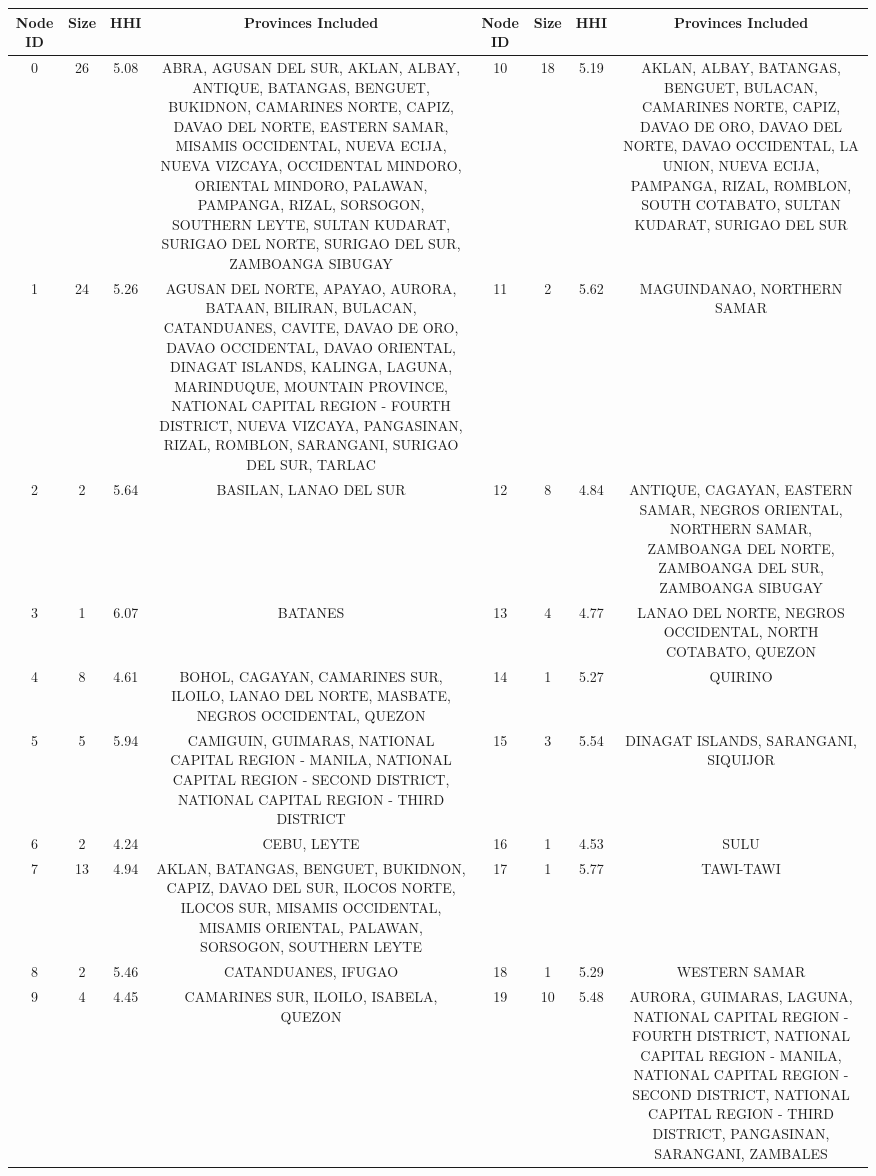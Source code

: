 \begin{tabular}{cccc|cccc}
\toprule
Node ID & Size & HHI & Provinces Included & Node ID & Size & HHI & Provinces Included \\
\midrule
0 & 26 & 5.08 & ABRA, AGUSAN DEL SUR, AKLAN, ALBAY, ANTIQUE, BATANGAS, BENGUET, BUKIDNON, CAMARINES NORTE, CAPIZ, DAVAO DEL NORTE, EASTERN SAMAR, MISAMIS OCCIDENTAL, NUEVA ECIJA, NUEVA VIZCAYA, OCCIDENTAL MINDORO, ORIENTAL MINDORO, PALAWAN, PAMPANGA, RIZAL, SORSOGON, SOUTHERN LEYTE, SULTAN KUDARAT, SURIGAO DEL NORTE, SURIGAO DEL SUR, ZAMBOANGA SIBUGAY & 10 & 18 & 5.19 & AKLAN, ALBAY, BATANGAS, BENGUET, BULACAN, CAMARINES NORTE, CAPIZ, DAVAO DE ORO, DAVAO DEL NORTE, DAVAO OCCIDENTAL, LA UNION, NUEVA ECIJA, PAMPANGA, RIZAL, ROMBLON, SOUTH COTABATO, SULTAN KUDARAT, SURIGAO DEL SUR \\
1 & 24 & 5.26 & AGUSAN DEL NORTE, APAYAO, AURORA, BATAAN, BILIRAN, BULACAN, CATANDUANES, CAVITE, DAVAO DE ORO, DAVAO OCCIDENTAL, DAVAO ORIENTAL, DINAGAT ISLANDS, KALINGA, LAGUNA, MARINDUQUE, MOUNTAIN PROVINCE, NATIONAL CAPITAL REGION - FOURTH DISTRICT, NUEVA VIZCAYA, PANGASINAN, RIZAL, ROMBLON, SARANGANI, SURIGAO DEL SUR, TARLAC & 11 & 2 & 5.62 & MAGUINDANAO, NORTHERN SAMAR \\
2 & 2 & 5.64 & BASILAN, LANAO DEL SUR & 12 & 8 & 4.84 & ANTIQUE, CAGAYAN, EASTERN SAMAR, NEGROS ORIENTAL, NORTHERN SAMAR, ZAMBOANGA DEL NORTE, ZAMBOANGA DEL SUR, ZAMBOANGA SIBUGAY \\
3 & 1 & 6.07 & BATANES & 13 & 4 & 4.77 & LANAO DEL NORTE, NEGROS OCCIDENTAL, NORTH COTABATO, QUEZON \\
4 & 8 & 4.61 & BOHOL, CAGAYAN, CAMARINES SUR, ILOILO, LANAO DEL NORTE, MASBATE, NEGROS OCCIDENTAL, QUEZON & 14 & 1 & 5.27 & QUIRINO \\
5 & 5 & 5.94 & CAMIGUIN, GUIMARAS, NATIONAL CAPITAL REGION - MANILA, NATIONAL CAPITAL REGION - SECOND DISTRICT, NATIONAL CAPITAL REGION - THIRD DISTRICT & 15 & 3 & 5.54 & DINAGAT ISLANDS, SARANGANI, SIQUIJOR \\
6 & 2 & 4.24 & CEBU, LEYTE & 16 & 1 & 4.53 & SULU \\
7 & 13 & 4.94 & AKLAN, BATANGAS, BENGUET, BUKIDNON, CAPIZ, DAVAO DEL SUR, ILOCOS NORTE, ILOCOS SUR, MISAMIS OCCIDENTAL, MISAMIS ORIENTAL, PALAWAN, SORSOGON, SOUTHERN LEYTE & 17 & 1 & 5.77 & TAWI-TAWI \\
8 & 2 & 5.46 & CATANDUANES, IFUGAO & 18 & 1 & 5.29 & WESTERN SAMAR \\
9 & 4 & 4.45 & CAMARINES SUR, ILOILO, ISABELA, QUEZON & 19 & 10 & 5.48 & AURORA, GUIMARAS, LAGUNA, NATIONAL CAPITAL REGION - FOURTH DISTRICT, NATIONAL CAPITAL REGION - MANILA, NATIONAL CAPITAL REGION - SECOND DISTRICT, NATIONAL CAPITAL REGION - THIRD DISTRICT, PANGASINAN, SARANGANI, ZAMBALES \\
\bottomrule
\end{tabular}
